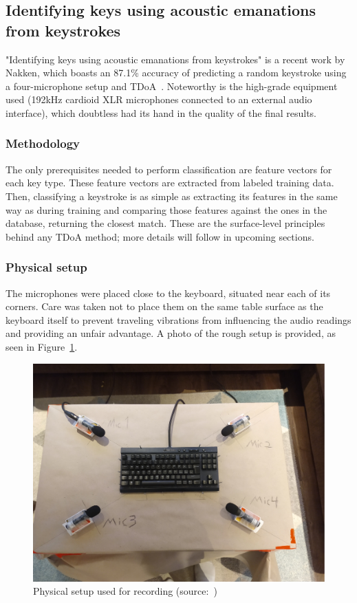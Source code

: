 \documentclass[../main.tex]{subfiles}
\begin{document}
\subsection{Identifying keys using acoustic emanations from keystrokes}
\label{sec:identifying_keys_using_acoustic_emanations_from_keystrokes}
"Identifying keys using acoustic emanations from keystrokes" is a recent work by Nakken, which boasts an 87.1\% accuracy of predicting a random
keystroke using a four-microphone setup and TDoA~\cite{nakken2023}. Noteworthy
is the high-grade equipment used (192kHz cardioid XLR microphones connected to
an external audio interface), which doubtless had its hand in the quality of
the final results.

\subsubsection{Methodology}
The only prerequisites needed to perform classification are feature vectors
for each key type. These feature vectors are extracted from labeled training
data. Then, classifying a keystroke is as simple as extracting
its features in the same way as during training and comparing those features
against the ones in the database, returning the closest match. These are the
surface-level principles behind any TDoA method; more details will follow
in upcoming sections.

\subsubsection{Physical setup}
The microphones were placed close to the keyboard, situated near each of its
corners. Care was taken not to place them on the same table surface as the
keyboard itself to prevent traveling vibrations from influencing the audio
readings and providing an unfair advantage. A photo of the rough setup is
provided, as seen in Figure~\ref{fig:nakken2023_setup}.

\begin{figure}[h]
    \centering
    \includegraphics[width=0.5\linewidth]{figures/nakken2023_setup.png}
    \caption{Physical setup used for recording (source:~\cite{nakken2023})}
    \label{fig:nakken2023_setup}
\end{figure}
\end{document}
